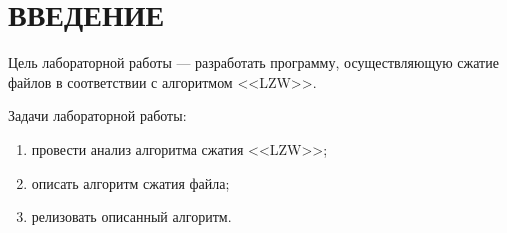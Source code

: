 \chapter*{ВВЕДЕНИЕ}

Цель лабораторной работы --- разработать программу, осуществляющую сжатие файлов в соответствии с алгоритмом <<LZW>>.

Задачи лабораторной работы:

\begin{enumerate}
    \item провести анализ алгоритма сжатия <<LZW>>;
    \item описать алгоритм сжатия файла;
    \item релизовать описанный алгоритм.
\end{enumerate}
